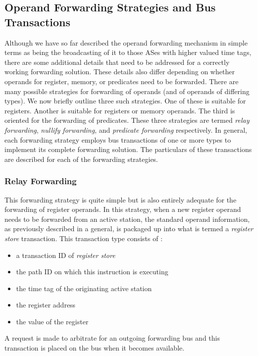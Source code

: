 \documentclass[10pt,dvips]{article}
\begin{document}
\subsection{Operand Forwarding Strategies and Bus Transactions}
%
Although we have so far described the operand forwarding mechanism
in simple terms as being the broadcasting of it 
to those ASes with higher valued 
time tags, there are some additional details that need to be
addressed for a correctly working forwarding solution.
These details also differ depending on whether operands for
register, memory, or predicates need to be forwarded.
There are many possible strategies for forwarding of operands
(and of operands of differing types). 
We now briefly outline three such strategies.
One of these is suitable for registers.
Another is suitable for registers or memory operands.
The third is oriented for the forwarding of predicates.
These three strategies are termed \textit{relay forwarding},
\textit{nullify forwarding}, and \textit{predicate forwarding}
respectively.
In general, each forwarding strategy employs bus transactions
of one or more types to implement its complete forwarding solution.
The particulars of these transactions are described for each
of the forwarding strategies.
%
%
\subsubsection{Relay Forwarding}
%
This forwarding strategy is quite simple but is also entirely
adequate for the forwarding of register operands.
In this strategy, when a new register operand needs to be forwarded
from an active station, the standard operand information, as 
previously described
in a general, is packaged up into what is termed
a \textit{register store} transaction.
This transaction type consists of :
%
\vspace{-0.05in}
\begin{itemize}
\vspace{-0.1in}
\item{a transaction ID of \textit{register store}}
\vspace{-0.1in}
\item{the path ID on which this instruction is executing}
\vspace{-0.1in}
\item{the time tag of the originating active station}
\vspace{-0.1in}
\item{the register address}
\vspace{-0.1in}
\item{the value of the register}
\vspace{-0.1in}
\end{itemize}   
%
A request is made to arbitrate for an outgoing forwarding bus
and this transaction is placed on the bus when it becomes available.
\end{document}
